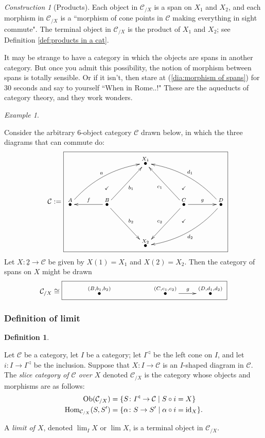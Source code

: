\documentclass{book}
\def\tn{\textnormal}
\def\mc{\mathcal}
\def\Hom{\tn{Hom}}
\def\Ob{\tn{Ob}}
\def\lcone{^\triangleleft}
\def\to{\rightarrow}
\def\taking{\colon}
\def\iso{\cong}
\def\|{{\;|\;}}
\def\ul{\underline}
\newcommand{\LMO}[1]{\stackrel{#1}{\bullet}}
\def\id{\tn{id}}
\def\mcC{\mc{C}}
\theoremstyle{remark}
\newtheorem{example}[subsubsection]{Example}
\newtheorem{construction}[subsubsection]{Construction}
\theoremstyle{definition}
\newtheorem{definition}[subsubsection]{Definition}
\begin{document}
\begin{construction}[Products]
Each object in $\mcC_{/X}$ is a span on $X_1$ and $X_2$, and each morphism in $\mcC_{/X}$ is a ``morphism of cone points in $\mcC$ making everything in sight commute". The terminal object in $\mcC_{/X}$ is the product of $X_1$ and $X_2$; see Definition \ref{def:products in a cat}.

\end{construction}

It may be strange to have a category in which the objects are spans in another category. But once you admit this possibility, the notion of morphism between spans is totally sensible. Or if it isn't, then stare at (\ref{dia:morphism of spans}) for 30 seconds and say to yourself ``When in Rome..!" These are the aqueducts of category theory, and they work wonders.

\begin{example}\label{ex:category of spans}

Consider the arbitrary 6-object category $\mcC$ drawn below, in which the three diagrams that can commute do:
$$\mcC:=\parbox{3in}{\fbox{\xymatrix@=39pt{&&\LMO{X_1}&\\\LMO{A}\ar@/^1pc/[urr]^a&\LMO{B}\ar[l]_f\ar@{}[u]|(.4){\checkmark}\ar[ur]_{b_1}\ar[dr]^{b_2}&&\LMO{C}\ar@{}[u]|(.4){\checkmark}\ar@{}[d]|(.4){\checkmark}\ar[ul]^{c_1}\ar[dl]_{c_2}\ar[r]^g&\LMO{D}\ar@/_1pc/[llu]_{d_1}\ar@/^1pc/[lld]^{d_2}\\&&\LMO{X_2}&}}}$$
Let $X\taking\ul{2}\to\mcC$ be given by $X(1)=X_1$ and $X(2)=X_2$. Then the category of spans on $X$ might be drawn
$$\mcC_{/X}\iso\fbox{\xymatrix{&\LMO{(B,b_1,b_2)}&&\LMO{(C,c_1,c_2)}\ar[r]^g&\LMO{(D,d_1,d_2)}}}$$

\end{example}


\subsubsection{Definition of limit}

\begin{definition}\label{def:slice and limit}

Let $\mcC$ be a category, let $I$ be a category; let $I\lcone$ be the left cone on $I$, and let $i\taking I\to I\lcone$ be the inclusion. Suppose that $X\taking I\to\mcC$ is an $I$-shaped diagram in $\mcC$. The {\em slice category of $\mcC$ over $X$} denoted $\mcC_{/X}$\index{a symbol!$\mcC_{/X}$} is the category whose objects and morphisms are as follows:
\begin{align*}
\Ob(\mcC_{/X})&=\{S\taking I\lcone\to\mcC\|S\circ i=X\}\\
\Hom_{\mcC_{/X}}(S,S')&=\{\alpha\taking S\to S'\|\alpha\circ i=\id_X\}.
\end{align*}

A {\em limit of $X$}, denoted $\lim_IX$ or $\lim X$, is a terminal object in $\mcC_{/X}$.

\end{definition}
\end{document}
